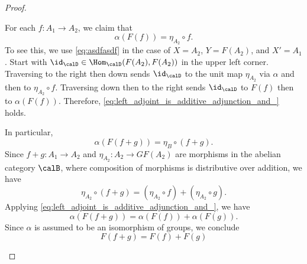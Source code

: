 \begin{proof}
\begin{enumerate}
        
        For each $f: A_1 \to A_2$, we claim that 
        \begin{equation} \label{eq:left_adjoint_is_additive_adjunction_and_}
        \alpha(F(f)) = \eta_{A_2} \circ f.
        \end{equation}
        To see this, we use \eqref{eq:asdfasdf} in the case of $X = A_2$, $Y = F(A_2)$, and $X' = A_1$. Start with $\id_{\calD} \in \Hom_\calD(F(A_2), F(A_2))$ in the upper left corner. Traversing to the right then down sends $\id_{\calD}$ to the unit map $\eta_{A_2}$ via $\alpha$ and then to $\eta_{A_2} \circ f$. Traversing down then to the right sends $\id_{\calD}$ to $F(f)$ then to $\alpha(F(f))$. Therefore, \eqref{eq:left_adjoint_is_additive_adjunction_and_} holds.

        In particular, 
        $$\alpha(F(f+g)) = \eta_B \circ (f+g).$$
        Since $f+g: A_1 \to A_2$ and $\eta_{A_2}: A_2 \to GF(A_2)$ are morphisms in the abelian category $\calB$, where composition of morphisms is distributive over addition, we have
        $$\eta_{A_2} \circ (f+g) = (\eta_{A_2} \circ f) + (\eta_{A_2} \circ g).$$
        Applying \eqref{eq:left_adjoint_is_additive_adjunction_and_}, we have
        $$\alpha(F(f+g)) = \alpha(F(f)) + \alpha(F(g)).$$
        Since $\alpha$ is assumed to be an isomorphism of groups, we conclude
        $$F(f+g) = F(f) + F(g)$$


\end{enumerate}
\end{proof}
